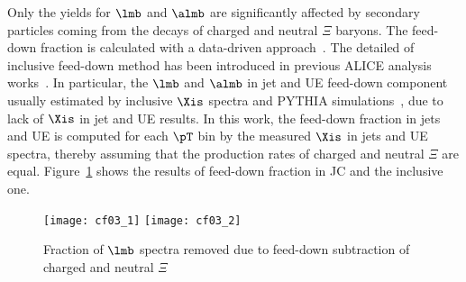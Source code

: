 \documentclass[ALICE,manyauthors]{cernphprep}
\begin{document}
Only the yields for $\lmb$ and $\almb$ are significantly affected by secondary particles coming from the decays of charged and neutral $\Xi$ baryons.
The feed-down fraction is calculated with a data-driven approach~\cite{Abelev:2013haa}.
The detailed of inclusive feed-down method has been introduced in previous ALICE analysis works~\cite{Acharya:2019kyh, Acharya:2020uxl, ALICE:2017jyt}.
In particular, the $\lmb$ and $\almb$ in jet and UE feed-down component usually estimated by inclusive $\Xis$ spectra and PYTHIA simulations~\cite{V0injet}, due to lack of $\Xis$ in jet and UE results.
In this work, the feed-down fraction in jets and UE is computed for each $\pT$ bin by the measured $\Xis$ in jets and UE spectra, thereby assuming that the production rates of charged and neutral $\Xi$ are equal.
Figure~\ref{fig:FdFrac} shows the results of feed-down fraction in JC and the inclusive one.
\begin{figure}[!ht]
	\begin{center}
		\texttt{[image: cf03\_1]}
		\texttt{[image: cf03\_2]}
	\end{center}
	\caption{Fraction of $\lmb$ spectra removed due to feed-down subtraction of charged and neutral $\Xi$}
	\label{fig:FdFrac}
\end{figure}
\end{document}

